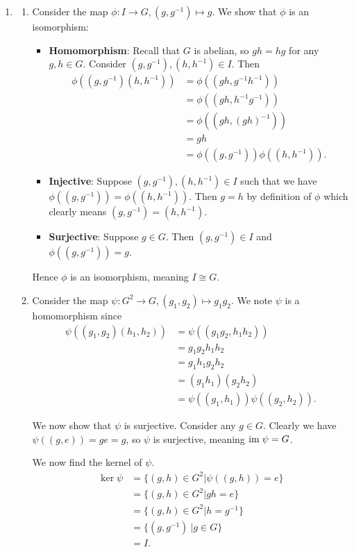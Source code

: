\begin{enumerate}
    \item \begin{enumerate}[label=(\roman*)]
        \item Consider the map $\phi: I \to G, (g, g^{-1}) \mapsto g$. We show that $\phi$ is an isomorphism:
        \begin{itemize}
            \item \textbf{Homomorphism}: Recall that $G$ is abelian, so $gh = hg$ for any $g, h \in G$. Consider $(g, g^{-1}), (h, h^{-1}) \in I$. Then
            \begin{align*}
                \phi((g, g^{-1})(h, h^{-1})) &= \phi((gh, g^{-1}h^{-1}))\\
                &= \phi((gh, h^{-1}g^{-1}))\\
                &= \phi((gh, (gh)^{-1}))\\
                &= gh\\
                &= \phi((g, g^{-1}))\phi((h, h^{-1})).
            \end{align*}
            \item \textbf{Injective}: Suppose $(g, g^{-1}), (h, h^{-1}) \in I$ such that we have $\phi((g, g^{-1})) = \phi((h, h^{-1}))$. Then $g = h$ by definition of $\phi$ which clearly means $(g, g^{-1}) = (h, h^{-1})$.
            \item \textbf{Surjective}: Suppose $g \in G$. Then $(g, g^{-1}) \in I$ and $\phi((g, g^{-1})) = g$.
        \end{itemize}
        Hence $\phi$ is an isomorphism, meaning $I \cong G$.
        
        \item Consider the map $\psi: G^2 \to G, (g_1, g_2) \mapsto g_1g_2$. We note $\psi$ is a homomorphism since
        \begin{align*}
            \psi((g_1, g_2)(h_1, h_2)) &= \psi((g_1g_2, h_1h_2))\\
            &= g_1g_2h_1h_2\\
            &= g_1h_1g_2h_2\\
            &= (g_1h_1)(g_2h_2)\\
            &= \psi((g_1, h_1))\psi((g_2, h_2)).
        \end{align*}
        
        We now show that $\psi$ is surjective. Consider any $g \in G$. Clearly we have $\psi((g, e)) = ge = g$, so $\psi$ is surjective, meaning $\mathrm{im}\;\psi = G$.
        
        We now find the kernel of $\psi$.
        \begin{align*}
            \ker\psi &= \{(g, h) \in G^2 \vert \psi((g, h)) = e\}\\
            &= \{(g, h) \in G^2 \vert gh = e\}\\
            &= \{(g, h) \in G^2 \vert h = g^{-1}\}\\
            &= \{(g, g^{-1}) \ | g \in G\}\\
            &= I.
        \end{align*}
        

\end{enumerate}
\end{enumerate}
